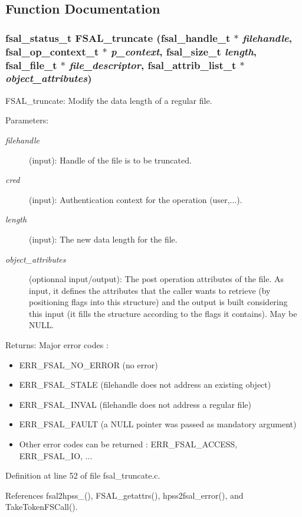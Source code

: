 \subsection{Function Documentation}
\subsubsection[{FSAL\_\-truncate}]{\setlength{\rightskip}{0pt plus 5cm}fsal\_\-status\_\-t FSAL\_\-truncate (fsal\_\-handle\_\-t $\ast$ {\em filehandle}, \/  fsal\_\-op\_\-context\_\-t $\ast$ {\em p\_\-context}, \/  fsal\_\-size\_\-t {\em length}, \/  fsal\_\-file\_\-t $\ast$ {\em file\_\-descriptor}, \/  fsal\_\-attrib\_\-list\_\-t $\ast$ {\em object\_\-attributes})}\label{fsal__truncate_8c_b31b6588cba9d27cbebd57163aec839a}


FSAL\_\-truncate: Modify the data length of a regular file.

\begin{Desc}
\item[Parameters:]
\begin{description}
\item[{\em filehandle}](input): Handle of the file is to be truncated. \item[{\em cred}](input): Authentication context for the operation (user,...). \item[{\em length}](input): The new data length for the file. \item[{\em object\_\-attributes}](optionnal input/output): The post operation attributes of the file. As input, it defines the attributes that the caller wants to retrieve (by positioning flags into this structure) and the output is built considering this input (it fills the structure according to the flags it contains). May be NULL.\end{description}
\end{Desc}
\begin{Desc}
\item[Returns:]Major error codes :\begin{itemize}
\item ERR\_\-FSAL\_\-NO\_\-ERROR (no error)\item ERR\_\-FSAL\_\-STALE (filehandle does not address an existing object)\item ERR\_\-FSAL\_\-INVAL (filehandle does not address a regular file)\item ERR\_\-FSAL\_\-FAULT (a NULL pointer was passed as mandatory argument)\item Other error codes can be returned : ERR\_\-FSAL\_\-ACCESS, ERR\_\-FSAL\_\-IO, ... \end{itemize}
\end{Desc}


Definition at line 52 of file fsal\_\-truncate.c.

References fsal2hpss\_(), FSAL\_\-getattrs(), hpss2fsal\_\-error(), and TakeTokenFSCall().